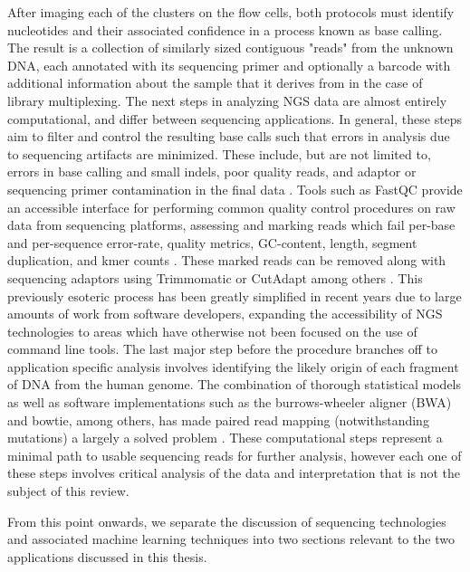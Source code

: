 After imaging each of the clusters on the flow cells, both protocols must identify nucleotides and their associated confidence in a process known as base calling. The result is a collection of similarly sized contiguous "reads" from the unknown DNA, each annotated with its sequencing primer and optionally a barcode with additional information about the sample that it derives from in the case of library multiplexing. The next steps in analyzing NGS data are almost entirely computational, and differ between sequencing applications. In general, these steps aim to filter and control the resulting base calls such that errors in analysis due to sequencing artifacts are minimized. These include, but are not limited to, errors in base calling and small \glspl{indel}, poor quality reads, and adaptor or sequencing primer contamination in the final data \cite{Slatko2018}. Tools such as FastQC provide an accessible interface for performing common quality control procedures on raw data from sequencing platforms, assessing and marking reads which fail per-base and per-sequence error-rate, quality metrics, GC-content, length, segment duplication, and kmer counts \cite{Andrews2015}. These marked reads can be removed along with sequencing adaptors using Trimmomatic or CutAdapt among others \cite{Martin2011a,Bolger2014}. This previously esoteric process has been greatly simplified in recent years due to large amounts of work from software developers, expanding the accessibility of NGS technologies to areas which have otherwise not been focused on the use of command line tools. The last major step before the procedure branches off to application specific analysis involves identifying the likely origin of each fragment of DNA from the human genome. The combination of thorough statistical models as well as software implementations such as the burrows-wheeler aligner (BWA) and bowtie, among others, has made paired read mapping (notwithstanding mutations) a largely a solved problem \cite{Langmead2009,Li2009}. These computational steps represent a minimal path to usable sequencing reads for further analysis, however each one of these steps involves critical analysis of the data and interpretation that is not the subject of this review.

From this point onwards, we separate the discussion of sequencing technologies and associated machine learning techniques into two sections relevant to the two applications discussed in this thesis.


